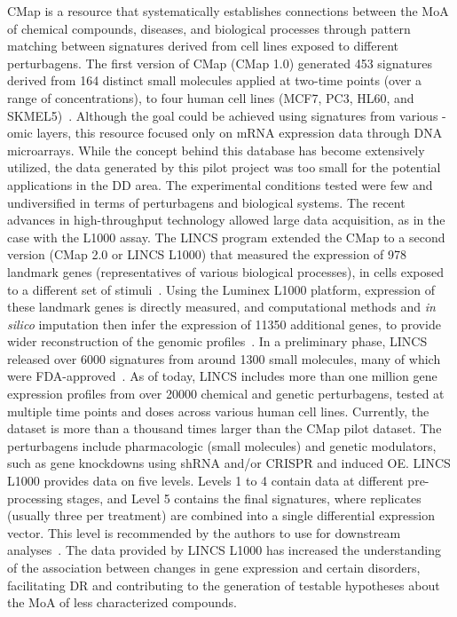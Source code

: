 \gls{CMap} is a resource that systematically establishes connections between the \gls{MoA} of chemical compounds, diseases, and biological processes through pattern matching between signatures derived from cell lines exposed to different perturbagens. The first version of \gls{CMap} (\gls{CMap} 1.0) generated 453 signatures derived from 164 distinct small molecules applied at two-time points (over a range of concentrations), to four human cell lines (MCF7, PC3, HL60, and SKMEL5)~\cite{RN34}.
Although the goal could be achieved using signatures from various -omic layers, this resource focused only on \gls{mRNA} expression data through \gls{DNA} microarrays. While the concept behind this database has become extensively utilized, the data generated by this pilot project was too small for the potential applications in the \gls{DD} area. The experimental conditions tested were few and undiversified in terms of perturbagens and biological systems. 
The recent advances in high-throughput technology allowed large data acquisition, as in the case with the L1000 assay.
The \gls{LINCS} program extended the \gls{CMap} to a second version (\gls{CMap} 2.0 or \gls{LINCS} L1000) that measured the expression of 978 landmark genes (representatives of various biological processes), in cells exposed to a different set of stimuli~\cite{RN30}. 
Using the Luminex L1000 platform, expression of these landmark genes is directly measured, and computational methods and \textit{in silico} imputation then infer the expression of 11350 additional genes, to provide wider reconstruction of the genomic profiles~\cite{RN30}. 
In a preliminary phase, \gls{LINCS} released over 6000 signatures from around 1300 small molecules, many of which were FDA-approved~\cite{RN115}. 
As of today, \gls{LINCS} includes more than one million gene expression profiles from over 20000 chemical and genetic perturbagens, tested at multiple time points and doses across various human cell lines. 
Currently, the dataset is more than a thousand times larger than the \gls{CMap} pilot dataset. 
The perturbagens include pharmacologic (small molecules) and genetic modulators, such as gene knockdowns using \gls{shRNA} and/or CRISPR and induced \gls{OE}. 
\gls{LINCS} L1000 provides data on five levels. 
Levels 1 to 4 contain data at different pre-processing stages, and Level 5 contains the final signatures, where replicates (usually three per treatment) are combined into a single differential expression vector. 
This level is recommended by the authors to use for downstream analyses~\cite{RN30}. 
The data provided by \gls{LINCS} L1000 has increased the understanding of the association between changes in gene expression and certain disorders, facilitating \gls{DR} and contributing to the generation of testable hypotheses about the \gls{MoA} of less characterized compounds. 

